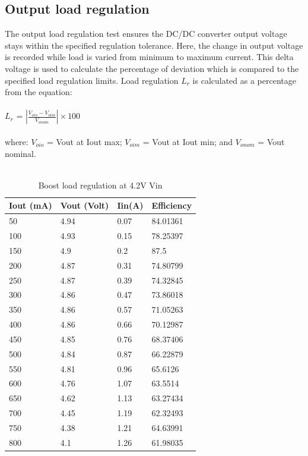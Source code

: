 \subsection{Output load regulation} 
The output load regulation test ensures the DC/DC converter output voltage stays within the specified regulation tolerance. Here, the change in output voltage is recorded while load is varied from minimum to maximum current. This delta voltage is used to calculate the percentage of deviation which is compared to the specified load regulation limits. Load regulation $L_{r}$ is calculated as a percentage from the equation:
\\ \\
\hspace*{5cm}$L_{r}$ = $\left | \frac{V_{oio}-V_{oim}}{V_{onom}} \right | \times 100$
\\ \\
where:
$V_{oio}$ = Vout at Iout max; 
$V_{oim}$ = Vout at Iout min; and
$V_{onom}$ = Vout nominal.
\\ \\
\begin{table}[h]
\centering
\begin{tabular}{|l|l|l|l|}
\hline
Iout (mA) & Vout (Volt) & Iin(A) & Efficiency \\ \hline
50        & 4.94        & 0.07   & 84.01361   \\ \hline
100       & 4.93        & 0.15   & 78.25397   \\ \hline
150       & 4.9         & 0.2    & 87.5       \\ \hline
200       & 4.87        & 0.31   & 74.80799   \\ \hline
250       & 4.87        & 0.39   & 74.32845   \\ \hline
300       & 4.86        & 0.47   & 73.86018   \\ \hline
350       & 4.86        & 0.57   & 71.05263   \\ \hline
400       & 4.86        & 0.66   & 70.12987   \\ \hline
450       & 4.85        & 0.76   & 68.37406   \\ \hline
500       & 4.84        & 0.87   & 66.22879   \\ \hline
550       & 4.81        & 0.96   & 65.6126    \\ \hline
600       & 4.76        & 1.07   & 63.5514    \\ \hline
650       & 4.62        & 1.13   & 63.27434   \\ \hline
700       & 4.45        & 1.19   & 62.32493   \\ \hline
750       & 4.38        & 1.21   & 64.63991   \\ \hline
800       & 4.1         & 1.26   & 61.98035   \\ \hline
\end{tabular}
\caption{Boost load regulation at 4.2V Vin}
\label{table:4}
\end{table}
